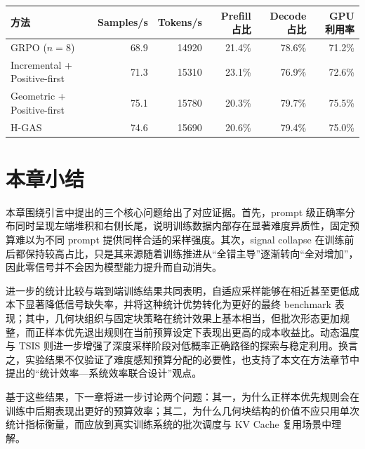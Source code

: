 \begin{table}[!htbp]
    \label{tab:exp_hardware_profile}
    \centering
    \small
    \setlength{\tabcolsep}{3pt}
    \begin{tabular}{lrrrrr}
        \hline
        方法 & Samples/s & Tokens/s & Prefill 占比 & Decode 占比 & GPU 利用率 \\
        \hline
        GRPO ($n=8$) & 68.9 & 14920 & 21.4\% & 78.6\% & 71.2\% \\
        Incremental + Positive-first & 71.3 & 15310 & 23.1\% & 76.9\% & 72.6\% \\
        Geometric + Positive-first & 75.1 & 15780 & 20.3\% & 79.7\% & 75.5\% \\
        H-GAS & 74.6 & 15690 & 20.6\% & 79.4\% & 75.0\% \\
        \hline
    \end{tabular}
\end{table}

\section{本章小结}

本章围绕引言中提出的三个核心问题给出了对应证据。首先，prompt 级正确率分布同时呈现左端堆积和右侧长尾，说明训练数据内部存在显著难度异质性，固定预算难以为不同 prompt 提供同样合适的采样强度。其次，signal collapse 在训练前后都保持较高占比，只是其来源随着训练推进从“全错主导”逐渐转向“全对增加”，因此零信号并不会因为模型能力提升而自动消失。

进一步的统计比较与端到端训练结果共同表明，自适应采样能够在相近甚至更低成本下显著降低信号缺失率，并将这种统计优势转化为更好的最终 benchmark 表现；其中，几何块组织与固定块策略在统计效果上基本相当，但批次形态更加规整，而正样本优先退出规则在当前预算设定下表现出更高的成本收益比。动态温度与 TSIS 则进一步增强了深度采样阶段对低概率正确路径的探索与稳定利用。换言之，实验结果不仅验证了难度感知预算分配的必要性，也支持了本文在方法章节中提出的“统计效率—系统效率联合设计”观点。

基于这些结果，下一章将进一步讨论两个问题：其一，为什么正样本优先规则会在训练中后期表现出更好的预算效率；其二，为什么几何块结构的价值不应只用单次统计指标衡量，而应放到真实训练系统的批次调度与 KV Cache 复用场景中理解。
